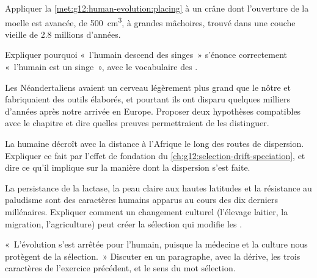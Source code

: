 \begin{exercise}[$\star\star$]\label{exo:g12:human-evolution:10}
Appliquer la \cref{met:g12:human-evolution:placing} à un crâne dont
l'ouverture de la moelle est avancée, de \qty{500}{cm^3}, à grandes
mâchoires, trouvé dans une couche vieille de 2.8 millions d'années.
\end{exercise}

\begin{exercise}[$\star\star$]\label{exo:g12:human-evolution:11}
Expliquer pourquoi «~l'humain descend des singes~» s'énonce
correctement «~l'humain est un singe~», avec le vocabulaire des
.
\end{exercise}

\begin{exercise}[$\star\star\star$]\label{exo:g12:human-evolution:12}
Les Néandertaliens avaient un cerveau légèrement plus grand que le
nôtre et fabriquaient des outils élaborés, et pourtant ils ont disparu
quelques milliers d'années après notre arrivée en Europe. Proposer
deux hypothèses compatibles avec le chapitre et dire quelles preuves
permettraient de les distinguer.
\end{exercise}

\begin{exercise}[$\star\star\star$]\label{exo:g12:human-evolution:13}
La  humaine décroît avec la distance à l'Afrique le
long des routes de dispersion. Expliquer ce fait par l'effet de
fondation du \cref{ch:g12:selection-drift-speciation}, et dire ce
qu'il implique sur la manière dont la dispersion s'est faite.
\end{exercise}

\begin{exercise}[$\star\star\star$]\label{exo:g12:human-evolution:14}
La persistance de la lactase, la peau claire aux hautes latitudes et
la résistance au paludisme sont des caractères humains apparus au
cours des dix derniers millénaires. Expliquer comment un changement
culturel (l'élevage laitier, la migration, l'agriculture) peut créer
la sélection qui modifie les .
\end{exercise}

\begin{exercise}[$\star\star\star$]\label{exo:g12:human-evolution:15}
«~L'évolution s'est arrêtée pour l'humain, puisque la médecine et la
culture nous protègent de la sélection.~» Discuter en un paragraphe,
avec la dérive, les trois caractères de l'exercice précédent, et le
sens du mot sélection.
\end{exercise}

